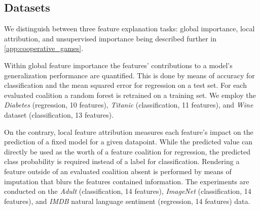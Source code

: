 \subsection{Datasets}
\label{subsec:datasets}

We distinguish between three feature explanation tasks: global importance, local attribution, and unsupervised importance being described further in \cref{app:cooperative_games}.

Within global feature importance \citep{Covert.2020} the features' contributions to a model's generalization performance are quantified.
This is done by means of accuracy for classification and the mean squared error for regression on a test set.
For each evaluated coalition a random forest is retrained on a training set.
We employ the \emph{Diabetes} (regression, 10 features), \emph{Titanic} (classification, 11 features), and \emph{Wine} dataset (classification, 13 features).

On the contrary, local feature attribution \citep{Lundberg.2017} measures each feature's impact on the prediction of a fixed model for a given datapoint.
While the predicted value can directly be used as the worth of a feature coalition for regression, the predicted class probability is required instead of a label for classification. Rendering a feature outside of an evaluated coalition absent is performed by means of imputation that blurs the features contained information.
The experiments are conducted on the \emph{Adult} (classification, 14 features), \emph{ImageNet} (classification, 14 features), and \emph{IMDB} natural language sentiment (regression, 14 features) data.

